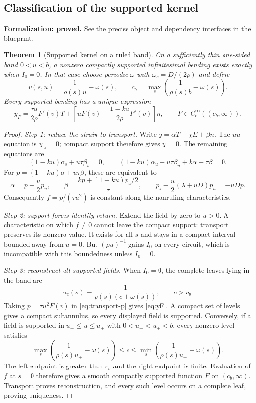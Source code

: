 \documentclass[11pt]{amsart}
\newtheorem{theorem}{Theorem}[section]
\theoremstyle{definition}
\theoremstyle{remark}
\numberwithin{equation}{section}
\begin{document}
\subsection{Classification of the supported kernel}
\par\noindent\textbf{Formalization: proved.} See the precise object and dependency interfaces in the blueprint.\par
\begin{theorem}[Supported kernel on a ruled band]\label{thm:ruled}
On a sufficiently thin one-sided band $0<u<b$, a nonzero compactly
supported infinitesimal bending exists exactly when $I_0=0$. In that
case choose periodic $\omega$ with $\omega_s=D/(2\rho)$ and define
\[
 v(s,u)=\frac1{\rho(s)u}-\omega(s),\qquad
 c_b=\max_s\left(\frac1{\rho(s)b}-\omega(s)\right).
\]
Every supported bending has a unique expression
\begin{equation}\label{eq:yF}
 y_F=\frac{\tau u}{2\rho}F'(v)T+
 \left[uF(v)-\frac{1-ku}{2\rho}F'(v)\right]n,
 \qquad F\in C_c^\infty((c_b,\infty)).
\end{equation}
\end{theorem}
\begin{proof}
\emph{Step 1: reduce the strain to transport.}
Write $y=\alpha T+\chi E+\beta n$. The $uu$ equation is $\chi_u=0$;
compact support therefore gives $\chi=0$. The remaining equations are
\[
 (1-ku)\alpha_s+u\tau\beta_s=0,\qquad
 (1-ku)\alpha_u+u\tau\beta_u+k\alpha-\tau\beta=0.
\]
For $p=(1-ku)\alpha+u\tau\beta$, these are equivalent to
\begin{equation}\label{eq:transport-p}
 \alpha=p-\frac u2p_u,\qquad
 \beta=\frac{kp+(1-ku)p_u/2}{\tau},\qquad
 p_s-\frac u2(\lambda+uD)p_u=-uDp.
\end{equation}
Consequently $f=p/(\tau u^2)$ is constant along the nonruling
characteristics.

\emph{Step 2: support forces identity return.}
Extend the field by zero to $u>0$. A characteristic on which $f\ne0$
cannot leave the compact support: transport preserves its nonzero value.
It exists for all $s$ and stays in a compact interval bounded away from
$u=0$. But $(\rho u)^{-1}$ gains $I_0$ on every circuit, which is
incompatible with this boundedness unless $I_0=0$.

\emph{Step 3: reconstruct all supported fields.}
When $I_0=0$, the complete leaves lying in the band are
\begin{equation}\label{eq:closed-leaves}
 u_c(s)=\frac1{\rho(s)(c+\omega(s))},\qquad c>c_b.
\end{equation}
Taking $p=\tau u^2F(v)$ in \eqref{eq:transport-p} gives \eqref{eq:yF}.
A compact set of levels gives a compact subannulus, so every displayed
field is supported. Conversely, if a field is supported in
$u_-\le u\le u_+$ with $0<u_-<u_+<b$, every nonzero level satisfies
\[
 \max_s\left(\frac1{\rho(s)u_+}-\omega(s)\right)
 \le c\le
 \min_s\left(\frac1{\rho(s)u_-}-\omega(s)\right).
\]
The left endpoint is greater than $c_b$ and the right endpoint is finite.
Evaluation of $f$ at $s=0$ therefore gives a smooth compactly supported
function $F$ on $(c_b,\infty)$. Transport proves reconstruction, and every
such level occurs on a complete leaf, proving uniqueness.
\end{proof}
\end{document}
